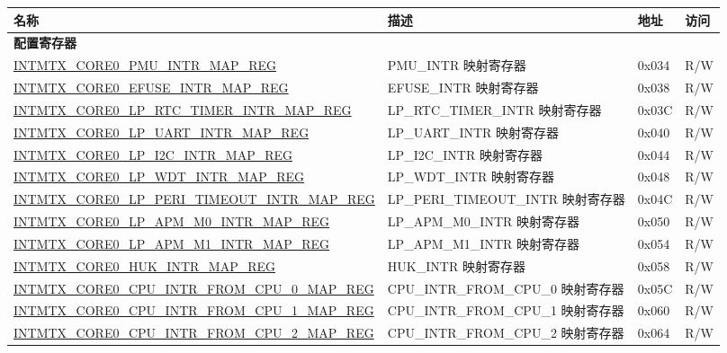 \begin{longtable}{ | p{10cm} | p{10cm} | p{1.3cm} | p{1cm} | }
\hline\rowcolor{lightgray}
名称 & 描述 &  地址 & 访问 \\ \hline
\endhead
\multicolumn{4}{|l|}{\textbf{配置寄存器}} \\ \hline

\hyperref[regdesc:INTMTXCORE0PMUINTRMAPREG]{INTMTX\_CORE0\_PMU\_INTR\_MAP\_REG} & PMU\_INTR 映射寄存器 & 0x034 & R/W  \\ \hline
\hyperref[regdesc:INTMTXCORE0EFUSEINTRMAPREG]{INTMTX\_CORE0\_EFUSE\_INTR\_MAP\_REG} & EFUSE\_INTR 映射寄存器 & 0x038 & R/W  \\ \hline
\hyperref[regdesc:INTMTXCORE0LPRTCTIMERINTRMAPREG]{INTMTX\_CORE0\_LP\_RTC\_TIMER\_INTR\_MAP\_REG} & LP\_RTC\_TIMER\_INTR 映射寄存器 & 0x03C & R/W  \\ \hline
\hyperref[regdesc:INTMTXCORE0LPUARTINTRMAPREG]{INTMTX\_CORE0\_LP\_UART\_INTR\_MAP\_REG} & LP\_UART\_INTR 映射寄存器 & 0x040 & R/W  \\ \hline
\hyperref[regdesc:INTMTXCORE0LPI2CINTRMAPREG]{INTMTX\_CORE0\_LP\_I2C\_INTR\_MAP\_REG} & LP\_I2C\_INTR 映射寄存器 & 0x044 & R/W  \\ \hline
\hyperref[regdesc:INTMTXCORE0LPWDTINTRMAPREG]{INTMTX\_CORE0\_LP\_WDT\_INTR\_MAP\_REG} & LP\_WDT\_INTR 映射寄存器 & 0x048 & R/W  \\ \hline
\hyperref[regdesc:INTMTXCORE0LPPERITIMEOUTINTRMAPREG]{INTMTX\_CORE0\_LP\_PERI\_TIMEOUT\_INTR\_MAP\_REG} & LP\_PERI\_TIMEOUT\_INTR 映射寄存器 & 0x04C & R/W  \\ \hline
\hyperref[regdesc:INTMTXCORE0LPAPMM0INTRMAPREG]{INTMTX\_CORE0\_LP\_APM\_M0\_INTR\_MAP\_REG} & LP\_APM\_M0\_INTR 映射寄存器 & 0x050 & R/W  \\ \hline
\hyperref[regdesc:INTMTXCORE0LPAPMM1INTRMAPREG]{INTMTX\_CORE0\_LP\_APM\_M1\_INTR\_MAP\_REG} & LP\_APM\_M1\_INTR 映射寄存器 & 0x054 & R/W  \\ \hline
\hyperref[regdesc:INTMTXCORE0HUKINTRMAPREG]{INTMTX\_CORE0\_HUK\_INTR\_MAP\_REG} & HUK\_INTR 映射寄存器 & 0x058 & R/W  \\ \hline
\hyperref[regdesc:INTMTXCORE0CPUINTRFROMCPU0MAPREG]{INTMTX\_CORE0\_CPU\_INTR\_FROM\_CPU\_0\_MAP\_REG} & CPU\_INTR\_FROM\_CPU\_0 映射寄存器 & 0x05C & R/W  \\ \hline
\hyperref[regdesc:INTMTXCORE0CPUINTRFROMCPU1MAPREG]{INTMTX\_CORE0\_CPU\_INTR\_FROM\_CPU\_1\_MAP\_REG} & CPU\_INTR\_FROM\_CPU\_1 映射寄存器 & 0x060 & R/W  \\ \hline
\hyperref[regdesc:INTMTXCORE0CPUINTRFROMCPU2MAPREG]{INTMTX\_CORE0\_CPU\_INTR\_FROM\_CPU\_2\_MAP\_REG} & CPU\_INTR\_FROM\_CPU\_2 映射寄存器 & 0x064 & R/W  \\ \hline

\end{longtable}
